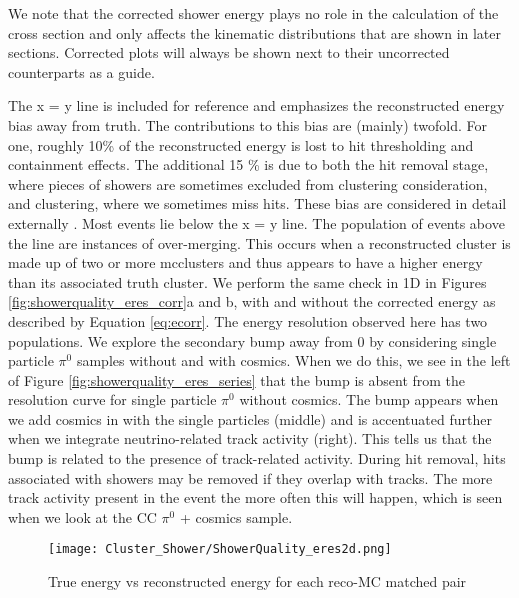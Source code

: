 \documentclass{article}
\begin{document}
\noindent We note that the corrected shower energy plays no role in the calculation of the cross section and only affects the kinematic distributions that are shown in later sections. Corrected plots will always be shown next to their uncorrected counterparts as a guide. 
\par The x = y line is included for reference and emphasizes the reconstructed energy bias away from truth. The contributions to this bias are (mainly) twofold. For one, roughly 10\% of the reconstructed energy is lost to hit thresholding and containment effects. The additional 15 \% is due to both the hit removal stage, where pieces of showers are sometimes excluded from clustering consideration, and clustering, where we sometimes miss hits. These bias are considered in detail externally \cite{bib:davidc_hitthresholding} \cite{bib:davidc_missingE}. Most events lie below the x = y line. The population of events above the line are instances of over-merging. This occurs when a reconstructed cluster is made up of two or more mcclusters and thus appears to have a higher energy than its associated truth cluster. We perform the same check in 1D in Figures \ref{fig:showerquality_eres_corr}a and b, with and without the corrected energy as described by Equation \ref{eq:ecorr}. The energy resolution observed here has two populations.  We explore the secondary bump away from 0 by considering single particle $\pi^0$ samples without and with cosmics.  When we do this, we see in the left of Figure \ref{fig:showerquality_eres_series} that the bump is absent from the resolution curve for single particle $\pi^0$ without cosmics.  The bump appears when we add cosmics in with the single particles (middle) and is accentuated further when we integrate neutrino-related track activity (right). This tells us that the bump is related to the presence of track-related activity.  During hit removal, hits associated with showers may be removed if they overlap with tracks.  The more track activity present in the event the more often this will happen, which is seen when we look at the CC $\pi^0$ + cosmics sample.  

\begin{figure}[h!]
\centering
\texttt{[image: Cluster\_Shower/ShowerQuality\_eres2d.png]}
\caption{True energy vs reconstructed energy for each reco-MC matched pair}
\label{fig:showerquality_eres}
\end{figure}
\end{document}
